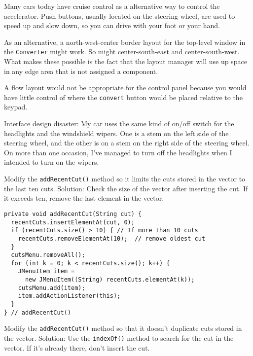 \begin{ANS}
\item  Many cars today have cruise control as a alternative way to control the
accelerator. Push buttons, usually located on the steering wheel, are
used to speed up and slow down, so you can drive with your foot
or your hand.

\item As an alternative, a north-west-center border layout for the
top-level window in the {\tt Converter} might work. So might
center-south-east and center-south-west. What makes these possible is
the fact that the layout manager will use up space in any edge area
that is not assigned a component.

\item  A flow layout would not be appropriate for the control panel because
you would have little control of where the {\tt convert} button would be
placed relative to the keypad.

\item  Interface design disaster: My car uses the same kind of on/off switch
for the headlights and the windshield wipers. One is a stem on the
left side of the steering wheel, and the other is on a stem on the
right side of the steering wheel. On more than one occasion, I've
managed to turn off the headlights when I intended to turn on the
wipers.

\item  Modify the {\tt addRecentCut()} method so it limits the cuts
stored in the vector to the last ten cuts. Solution: Check
the size of the vector after inserting the cut. If it
exceeds ten, remove the last element in the vector.

\begin{jjjlisting}
\begin{lstlisting}
private void addRecentCut(String cut) {
  recentCuts.insertElementAt(cut, 0);
  if (recentCuts.size() > 10) { // If more than 10 cuts
    recentCuts.removeElementAt(10);  // remove oldest cut
  }
  cutsMenu.removeAll();
  for (int k = 0; k < recentCuts.size(); k++) {
    JMenuItem item = 
      new JMenuItem((String) recentCuts.elementAt(k));
    cutsMenu.add(item);
    item.addActionListener(this);
  }
} // addRecentCut()
\end{lstlisting}
\end{jjjlisting}

\item  Modify the {\tt addRecentCut()} method so that it doesn't duplicate
cuts stored in the vector. Solution: Use the {\tt indexOf()} method
to search for the cut in the vector. If it's already there,
don't insert the cut.


\end{ANS}
